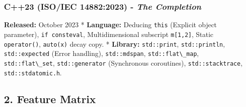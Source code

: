 \hypertarget{c23-isoiec-148822023---the-completion}{%
\subsubsection{\texorpdfstring{\textbf{C++23 (ISO/IEC 14882:2023)} -
\emph{The
Completion}}{C++23 (ISO/IEC 14882:2023) - The Completion}}\label{c23-isoiec-148822023---the-completion}}

\textbf{Released:} October 2023 * \textbf{Language:} Deducing
\passthrough{\lstinline!this!} (Explicit object parameter),
\passthrough{\lstinline!if consteval!}, Multidimensional subscript
\passthrough{\lstinline!m[1,2]!}, Static
\passthrough{\lstinline!operator()!}, \passthrough{\lstinline!auto(x)!}
decay copy. * \textbf{Library:} \passthrough{\lstinline!std::print!},
\passthrough{\lstinline!std::println!},
\passthrough{\lstinline!std::expected!} (Error handling),
\passthrough{\lstinline!std::mdspan!},
\passthrough{\lstinline!std::flat\_map!},
\passthrough{\lstinline!std::flat\_set!},
\passthrough{\lstinline!std::generator!} (Synchronous coroutines),
\passthrough{\lstinline!std::stacktrace!},
\passthrough{\lstinline!std::stdatomic.h!}.

\hypertarget{feature-matrix}{%
\subsection{2. Feature Matrix}\label{feature-matrix}}

